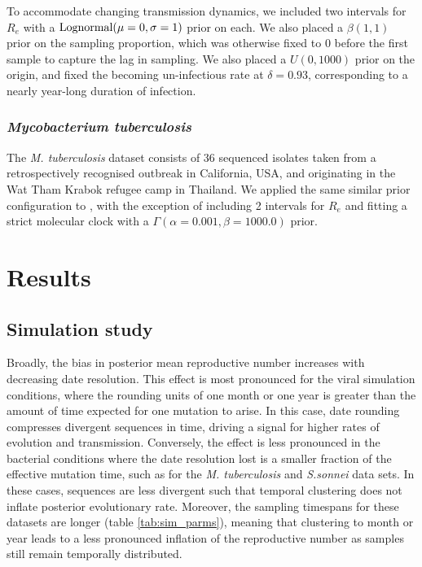 \documentclass{article}
\begin{document}
\begin{spacing}{1.5}
To accommodate changing transmission dynamics, we included two intervals for $R_e$ with a $\textnormal{Lognormal}(\mu=0,\sigma=1)$ prior on each. We also placed a $\beta(1,1)$ prior on the sampling proportion, which was otherwise fixed to 0 before the first sample to capture the lag in sampling. We also placed a $U(0,1000)$ prior on the origin, and fixed the becoming un-infectious rate at $\delta=0.93$, corresponding to a nearly year-long duration of infection.

\subsubsection*{\textit{Mycobacterium tuberculosis}}
The \textit{M. tuberculosis} dataset consists of 36 sequenced isolates taken from a retrospectively recognised outbreak in California, USA, and originating in the Wat Tham Krabok refugee camp in Thailand. We applied the same similar prior configuration to \citet{kuhnert_tuberculosis_2018}, with the exception of including 2 intervals for $R_e$ and fitting a strict molecular clock with a $\Gamma(\alpha=0.001,\beta=1000.0)$ prior.

\section*{Results}
\subsection*{Simulation study}
Broadly, the bias in posterior mean reproductive number increases with decreasing date resolution. This effect is most pronounced for the viral simulation conditions, where the rounding units of one month or one year is greater than the amount of time expected for one mutation to arise. In this case, date rounding compresses divergent sequences in time, driving a signal for higher rates of evolution and transmission. Conversely, the effect is less pronounced in the bacterial conditions where the date resolution lost is a smaller fraction of the effective mutation time, such as for the \textit{M. tuberculosis} and \textit{S.sonnei} data sets. In these cases, sequences are less divergent such that temporal clustering does not inflate posterior evolutionary rate. Moreover, the sampling timespans for these datasets are longer (table \ref{tab:sim_parms}), meaning that clustering to month or year leads to a less pronounced inflation of the reproductive number as samples still remain temporally distributed.


\end{spacing}
\end{document}
